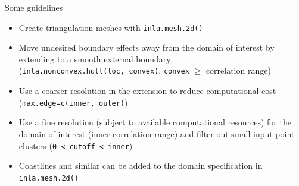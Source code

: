 \documentclass[
  ignorenonframetext,
]{beamer}
\begin{document}
\begin{frame}[fragile]{Some guidelines}
\protect\hypertarget{some-guidelines}{}
\begin{itemize}
\item
  Create triangulation meshes with \texttt{inla.mesh.2d()}
\item
  Move undesired boundary effects away from the domain of interest by
  extending to a smooth external boundary
  (\texttt{inla.nonconvex.hull(loc,\ convex)}, \texttt{convex} \(\geq\)
  correlation range)
\item
  Use a coarser resolution in the extension to reduce computational cost
  (\texttt{max.edge=c(inner,\ outer)})
\item
  Use a fine resolution (subject to available computational resources)
  for the domain of interest (inner correlation range) and filter out
  small input point clusters
  (\texttt{0\ \textless{}\ cutoff\ \textless{}\ inner})
\item
  Coastlines and similar can be added to the domain specification in
  \texttt{inla.mesh.2d()}
\end{itemize}
\end{frame}
\end{document}
